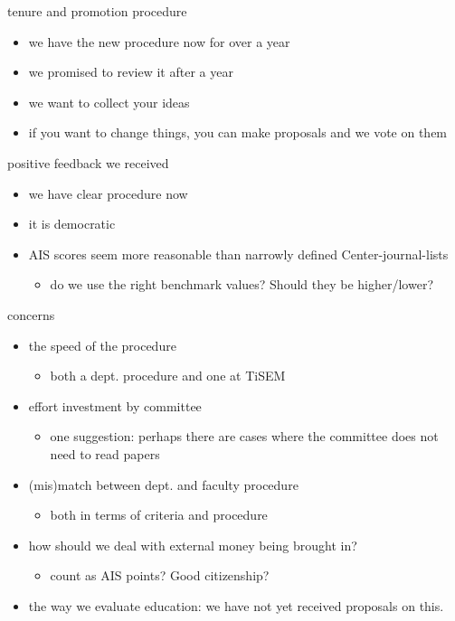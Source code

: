 \documentclass[presentation]{beamer}
\begin{document}
\begin{frame}[label={sec:orgbabc164}]{tenure and promotion procedure}
\begin{itemize}
\item we have the new procedure now for over a year
\item we promised to review it after a year
\item we want to collect your ideas
\item if you want to change things, you can make proposals and we vote on them
\end{itemize}


\begin{block}{positive feedback we received}
\begin{itemize}
\item we have clear procedure now
\item it is democratic
\item AIS scores seem more reasonable than narrowly defined Center-journal-lists
\begin{itemize}
\item do we use the right benchmark values? Should they be higher/lower?
\end{itemize}
\end{itemize}
\end{block}



\begin{block}{concerns}
\begin{itemize}
\item the speed of the procedure
\begin{itemize}
\item both a dept. procedure and one at TiSEM
\end{itemize}
\item effort investment by committee
\begin{itemize}
\item one suggestion: perhaps there are cases where the committee does not need to read papers
\end{itemize}
\item (mis)match between dept. and faculty procedure
\begin{itemize}
\item both in terms of criteria and procedure
\end{itemize}
\item how should we deal with external money being brought in?
\begin{itemize}
\item count as AIS points? Good citizenship?
\end{itemize}
\item the way we evaluate education: we have not yet received proposals on this.
\end{itemize}
\end{block}



\end{frame}
\end{document}
